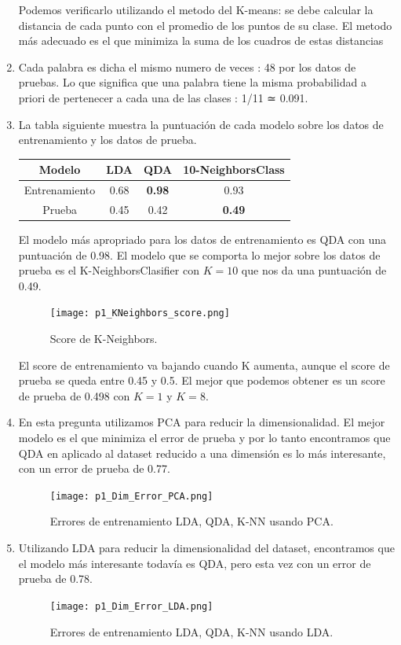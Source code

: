 \documentclass[11pt,letterpaper]{article}
\begin{document}
\begin{enumerate}
Podemos verificarlo utilizando el metodo del K-means: se debe calcular la
distancia de cada punto con el promedio de los puntos de su clase. El
metodo más adecuado es el que minimiza la suma de los cuadros de estas
distancias
\item Cada palabra es dicha el mismo numero de veces : 48 por los datos de
pruebas. Lo que significa que una palabra tiene la misma probabilidad a
priori de pertenecer a cada una de las clases : 1/11 ≃ 0.091.
\item La tabla siguiente muestra la puntuación de cada modelo sobre los datos de
entrenamiento y los datos de prueba.

\begin{center}
\begin{tabular}{|c|c|c|c|}
\hline
Modelo & LDA & QDA & 10-NeighborsClass\\
\hline
Entrenamiento & 0.68 & \textbf{0.98} & 0.93\\
Prueba & 0.45 & 0.42 & \textbf{0.49}\\
\hline
\end{tabular}
\end{center}

El modelo más apropriado para los datos de entrenamiento es QDA con una
puntuación de 0.98. El modelo que se comporta lo mejor sobre los datos de
prueba es el K-NeighborsClasifier con \(K = 10\) que nos da una puntuación de
0.49.

\begin{figure}[H]
\centering
\texttt{[image: p1\_KNeighbors\_score.png]}
\caption{Score de K-Neighbors.}
\end{figure}
El score de entrenamiento va bajando cuando K aumenta, aunque el score de
prueba se queda entre 0.45 y 0.5. El mejor que podemos obtener es un score
de prueba de 0.498 con \(K = 1\) y \(K = 8\).

\item En esta pregunta utilizamos PCA para reducir la dimensionalidad. El mejor
modelo es el que minimiza el error de prueba y por lo tanto encontramos que
QDA en aplicado al dataset reducido a una dimensión es lo más interesante,
con un error de prueba de 0.77.

\begin{figure}[H]
\centering
\texttt{[image: p1\_Dim\_Error\_PCA.png]}
\caption{Errores de entrenamiento LDA, QDA, K-NN usando PCA.}
\end{figure}
\item Utilizando LDA para reducir la dimensionalidad del dataset, encontramos que
el modelo más interesante todavía es QDA, pero esta vez con un error de
prueba de 0.78.

\begin{figure}[H]
\centering
\texttt{[image: p1\_Dim\_Error\_LDA.png]}
\caption{Errores de entrenamiento LDA, QDA, K-NN usando LDA.}
\end{figure}
\end{enumerate}
\end{document}
